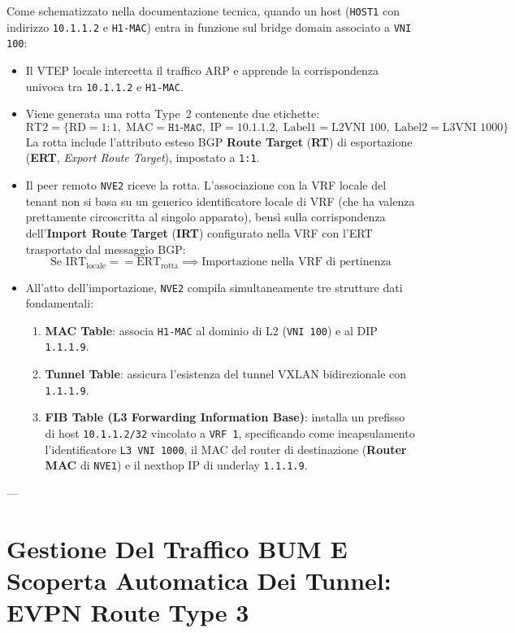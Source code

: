 \documentclass[11pt, a4paper]{article}
\begin{document}
Come schematizzato nella documentazione tecnica, quando un host (\texttt{HOST1} con indirizzo \texttt{10.1.1.2} e \texttt{H1-MAC}) entra in funzione sul bridge domain associato a \texttt{VNI 100}:
\begin{itemize}
    \item Il VTEP locale intercetta il traffico ARP e apprende la corrispondenza univoca tra \texttt{10.1.1.2} e \texttt{H1-MAC}.
    \item Viene generata una rotta Type~2 contenente due etichette:
    \[
    \text{RT2} = \Big\{ \text{RD}=1:1, \; \text{MAC}=\texttt{H1-MAC}, \; \text{IP}=10.1.1.2, \; \text{Label1}=\text{L2VNI } 100, \; \text{Label2}=\text{L3VNI } 1000 \Big\}
    \]
    La rotta include l'attributo esteso BGP \textbf{Route Target} (\textbf{RT}) di esportazione (\textbf{ERT}, \emph{Export Route Target}), impostato a \texttt{1:1}.
    \item Il peer remoto \texttt{NVE2} riceve la rotta. L'associazione con la VRF locale del tenant non si basa su un generico identificatore locale di VRF (che ha valenza prettamente circoscritta al singolo apparato), bensì sulla corrispondenza dell'\textbf{Import Route Target} (\textbf{IRT}) configurato nella VRF con l'ERT trasportato dal messaggio BGP:
    \[
    \text{Se } \text{IRT}_{\text{locale}} == \text{ERT}_{\text{rotta}} \implies \text{Importazione nella VRF di pertinenza}
    \]
    \item All'atto dell'importazione, \texttt{NVE2} compila simultaneamente tre strutture dati fondamentali:
    \begin{enumerate}[noitemsep]
        \item \textbf{MAC Table}: associa \texttt{H1-MAC} al dominio di L2 (\texttt{VNI 100}) e al DIP \texttt{1.1.1.9}.
        \item \textbf{Tunnel Table}: assicura l'esistenza del tunnel VXLAN bidirezionale con \texttt{1.1.1.9}.
        \item \textbf{FIB Table (L3 Forwarding Information Base)}: installa un prefisso di host \texttt{10.1.1.2/32} vincolato a \texttt{VRF 1}, specificando come incapsulamento l'identificatore \texttt{L3 VNI 1000}, il MAC del router di destinazione (\textbf{Router MAC} di \texttt{NVE1}) e il nexthop IP di underlay \texttt{1.1.1.9}.
    \end{enumerate}
\end{itemize}

---

\newpage

\section{Gestione Del Traffico BUM E Scoperta Automatica Dei Tunnel: EVPN Route Type 3}
\end{document}
